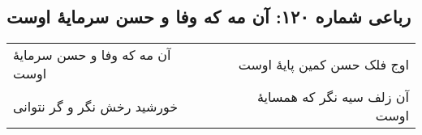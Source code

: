 \begin{center}
\section*{رباعی شماره ۱۲۰: آن مه که وفا و حسن سرمایهٔ اوست}
\label{sec:sh120}
\begin{longtable}{l p{0.5cm} r}
آن مه که وفا و حسن سرمایهٔ اوست
&&
اوج فلک حسن کمین پایهٔ اوست
\\
خورشید رخش نگر و گر نتوانی
&&
آن زلف سیه نگر که همسایهٔ اوست
\\
\end{longtable}
\end{center}
